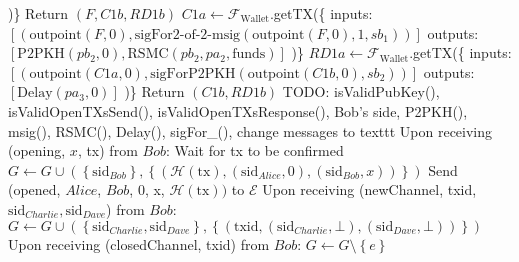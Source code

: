\begin{algorithmic}[1]
      \State )\}
      \State Return $\left(F, C1b, RD1b\right)$
    \EndProcedure
    \State
      \State $C1a \gets \mathcal{F}_{\mathrm{Wallet}}$.getTX(\{
      \State inputs: $\left[\left(\mathrm{outpoint}\left(F, 0\right),
      \text{sigFor2-of-2-msig}\left(\mathrm{outpoint}\left(F, 0\right), 1,
      sb_1\right)\right)\right]$
      \State outputs: $\left[\mathrm{P2PKH}\left(pb_2, 0\right), \mathrm{RSMC}\left(pb_2,
      pa_2, \mathrm{funds}\right)\right]$
      \State )\}
      \State $RD1a \gets \mathcal{F}_{\mathrm{Wallet}}$.getTX(\{
      \State inputs: $\left[\left(\mathrm{outpoint}\left(C1a, 0\right),
      \text{sigForP2PKH}\left(\mathrm{outpoint}\left(C1b, 0\right),
      sb_2\right)\right)\right]$
      \State outputs: $\left[\mathrm{Delay}\left(pa_3, 0\right)\right]$
      \State )\}
      \State Return $\left(C1b, RD1b\right)$
    \EndProcedure
    \State
    \State TODO: isValidPubKey(), isValidOpenTXsSend(), isValidOpenTXsResponse(), Bob's
    side, P2PKH(), msig(), RSMC(), Delay(), sigFor\_(), change messages to texttt
    \State Upon receiving (opening, $x$, tx) from $Bob$:
      \State Wait for tx to be confirmed
      \State $G \leftarrow G \cup \left(\left\{\mathrm{sid}_{Bob}\right\},
      \left\{\left(\mathcal{H}\left(\mathrm{tx}\right), \left(\mathrm{sid}_{Alice},
      0\right), \left(\mathrm{sid}_{Bob}, x\right)\right)\right\}\right)$ 
      \State Send (opened, $Alice$, $Bob$, 0, x, $\mathcal{H}\left(\mathrm{tx}\right))$ to
      $\mathcal{E}$
    \State
    \State Upon receiving (newChannel, txid, $\mathrm{sid}_{Charlie},
    \mathrm{sid}_{Dave}$) from $Bob$:
        \State $G \leftarrow G \cup \left(\left\{\mathrm{sid}_{Charlie},
        \mathrm{sid}_{Dave}\right\}, \left\{\left(\mathrm{txid},
        \left(\mathrm{sid}_{Charlie}, \bot\right), \left(\mathrm{sid}_{Dave},
        \bot\right)\right)\right\}\right)$ 
      \EndIf
    \State
    \State Upon receiving (closedChannel, txid) from $Bob$:
        \State $G \leftarrow G \setminus \left\{e\right\}$

\end{algorithmic}
